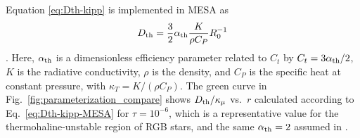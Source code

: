 Equation \eqref{eq:Dth-kipp} is implemented in MESA as
\begin{equation} \label{eq:Dth-kipp-MESA}
    \Dth = \frac{3}{2} \alpha_{\rm{th}} \frac{K}{\rho C_P}R_0^{-1}
\end{equation}
\citep[see Eq.~(14) of][]{mesa2}. 
Here, $\alpha_{\rm{th}}$ is a dimensionless efficiency parameter related to $C_t$ by $C_t = 3\alpha_{\rm{th}}/2$, $K$ is the radiative conductivity, $\rho$ is the density, and $C_P$ is the specific heat at constant pressure, with $\kappa_T = K/(\rho C_P)$. 
The green curve in Fig.~\ref{fig:parameterization_compare} shows $D_\mathrm{th}/\kappa_\mu$ vs.~$r$ calculated according to Eq.~\eqref{eq:Dth-kipp-MESA} for $\tau = 10^{-6}$, which is a representative value for the thermohaline-unstable region of RGB stars, and the same $\alpha_{\rm{th}} = 2$ assumed in \citet{CantielloLanger}.

